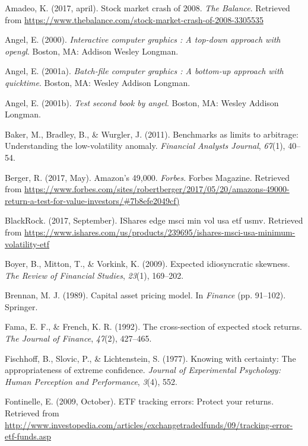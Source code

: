 \documentclass[12pt,twoside]{reedthesis}
\theoremstyle{definition}
\theoremstyle{definition}
\theoremstyle{definition}
\theoremstyle{remark}
\begin{document}
\hypertarget{refs}{}
\hypertarget{ref-amadeo2017}{}
Amadeo, K. (2017, april). Stock market crash of 2008. \emph{The
Balance}. Retrieved from
\url{https://www.thebalance.com/stock-market-crash-of-2008-3305535}

\hypertarget{ref-angel2000}{}
Angel, E. (2000). \emph{Interactive computer graphics : A top-down
approach with opengl}. Boston, MA: Addison Wesley Longman.

\hypertarget{ref-angel2001}{}
Angel, E. (2001a). \emph{Batch-file computer graphics : A bottom-up
approach with quicktime}. Boston, MA: Wesley Addison Longman.

\hypertarget{ref-angel2002a}{}
Angel, E. (2001b). \emph{Test second book by angel}. Boston, MA: Wesley
Addison Longman.

\hypertarget{ref-baker2011}{}
Baker, M., Bradley, B., \& Wurgler, J. (2011). Benchmarks as limits to
arbitrage: Understanding the low-volatility anomaly. \emph{Financial
Analysts Journal}, \emph{67}(1), 40--54.

\hypertarget{ref-berger2017}{}
Berger, R. (2017, May). Amazon's 49,000. \emph{Forbes}. Forbes Magazine.
Retrieved from
\url{https://www.forbes.com/sites/robertberger/2017/05/20/amazons-49000-return-a-test-for-value-investors/\#7b8efe2049cf)}

\hypertarget{ref-blackrock2017}{}
BlackRock. (2017, September). IShares edge msci min vol usa etf
\textbar{} usmv. Retrieved from
\url{https://www.ishares.com/us/products/239695/ishares-msci-usa-minimum-volatility-etf}

\hypertarget{ref-boyer2009}{}
Boyer, B., Mitton, T., \& Vorkink, K. (2009). Expected idiosyncratic
skewness. \emph{The Review of Financial Studies}, \emph{23}(1),
169--202.

\hypertarget{ref-brennan1989}{}
Brennan, M. J. (1989). Capital asset pricing model. In \emph{Finance}
(pp. 91--102). Springer.

\hypertarget{ref-fama1992}{}
Fama, E. F., \& French, K. R. (1992). The cross-section of expected
stock returns. \emph{The Journal of Finance}, \emph{47}(2), 427--465.

\hypertarget{ref-fischhoff1977}{}
Fischhoff, B., Slovic, P., \& Lichtenstein, S. (1977). Knowing with
certainty: The appropriateness of extreme confidence. \emph{Journal of
Experimental Psychology: Human Perception and Performance}, \emph{3}(4),
552.

\hypertarget{ref-fontinelle2009}{}
Fontinelle, E. (2009, October). ETF tracking errors: Protect your
returns. Retrieved from
\url{http://www.investopedia.com/articles/exchangetradedfunds/09/tracking-error-etf-funds.asp}
\end{document}
